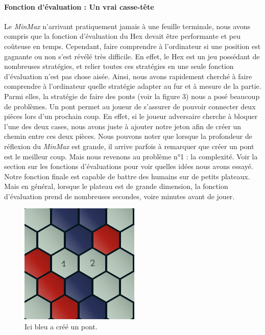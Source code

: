 \paragraph{Fonction d'évaluation : Un vrai casse-tête}
Le \emph{MinMax} n'arrivant pratiquement jamais à une feuille terminale, nous avons compris que la fonction
d'évaluation du Hex devait être performante et peu coûteuse en temps. Cependant, faire comprendre à l'ordinateur si une position est gagnante
ou non s'est révélé très difficile. En effet, le Hex est un jeu possédant de nombreuses stratégies, et relier toutes ces stratégies en une
seule fonction d'évaluation n'est pas chose aisée. Ainsi, nous avons rapidement cherché à faire comprendre à l'ordinateur
quelle stratégie adapter au fur et à mesure de la partie. Parmi elles, la stratégie de faire des ponts (voir la figure 3) nous a posé beaucoup de problèmes.
Un pont permet au joueur de s'assurer de pouvoir connecter deux pièces lors d'un prochain coup. En effet, si le joueur adversaire cherche à bloquer
l'une des deux cases, nous avons juste à ajouter notre jeton afin de créer un chemin entre ces deux pièces. Nous pouvons noter que lorsque la profondeur de
réflexion du \emph{MinMax} est grande, il arrive parfois à remarquer que créer un pont est le meilleur coup. Mais nous revenons au problème n°1 : la complexité.
Voir la section sur les fonctions d'évaluations pour voir quelles idées nous avons essayé. Notre fonction finale est capable de battre des humains sur de petits 
plateaux. Mais en général, lorsque le plateau est de grande dimension, la fonction d'évaluation prend de nombreuses secondes, voire minutes avant de jouer.

\begin{figure}[h]
    \begin{center}
        \includegraphics[scale=0.5]{root/pont.png}
    \end{center}
    \caption[1]{Ici bleu a créé un pont\footnotemark.}\label{fig:pont_bleu}
\end{figure}

